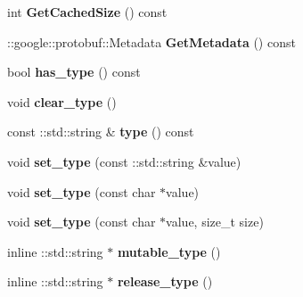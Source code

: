 \begin{DoxyCompactItemize}
int {\bfseries Get\+Cached\+Size} () const
\item 
\mbox{\label{classcaffe_1_1_filler_parameter_aa4e891972d2c5dbc736063fea939ebca}} 
\+::google\+::protobuf\+::\+Metadata {\bfseries Get\+Metadata} () const
\item 
\mbox{\label{classcaffe_1_1_filler_parameter_a3565979b490fe914189ba10ad9dd1a5b}} 
bool {\bfseries has\+\_\+type} () const
\item 
\mbox{\label{classcaffe_1_1_filler_parameter_af24e8649ea347a3328902ababad7e47f}} 
void {\bfseries clear\+\_\+type} ()
\item 
\mbox{\label{classcaffe_1_1_filler_parameter_ae491ae397905852261463840185061cc}} 
const \+::std\+::string \& {\bfseries type} () const
\item 
\mbox{\label{classcaffe_1_1_filler_parameter_ade94b62c66bb70b3ec21961550f04d5a}} 
void {\bfseries set\+\_\+type} (const \+::std\+::string \&value)
\item 
\mbox{\label{classcaffe_1_1_filler_parameter_a81a6a481c8455475e2c6c1709294c74f}} 
void {\bfseries set\+\_\+type} (const char $\ast$value)
\item 
\mbox{\label{classcaffe_1_1_filler_parameter_aa9a0ae6773233b2d5d62f0cdba2b90aa}} 
void {\bfseries set\+\_\+type} (const char $\ast$value, size\+\_\+t size)
\item 
\mbox{\label{classcaffe_1_1_filler_parameter_a7fbf8c4309340a772568bce33c93e9bc}} 
inline \+::std\+::string $\ast$ {\bfseries mutable\+\_\+type} ()
\item 
\mbox{\label{classcaffe_1_1_filler_parameter_a18b134523dcc7e232c19b3b38545c3b5}} 
inline \+::std\+::string $\ast$ {\bfseries release\+\_\+type} ()
\item 
\mbox{\label{classcaffe_1_1_filler_parameter_a44d0e27fd4cc367aa13da67a0ac6585d}} 

\end{DoxyCompactItemize}
